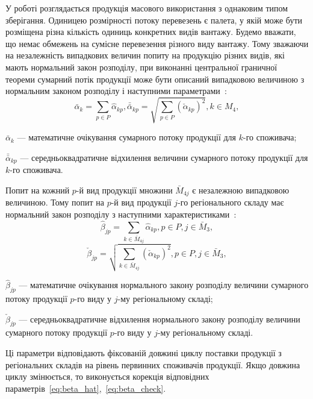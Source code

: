 У роботі розглядається продукція масового використання з однаковим типом зберігання. Одиницею розмірності потоку перевезень є палета, у якій може бути розміщена різна кількість одиниць конкретних видів вантажу. Будемо вважати, що немає обмежень на сумісне перевезення різного виду вантажу. Тому зважаючи на незалежність випадкових величин попиту на продукцію різних видів, які мають нормальний закон розподілу, при виконанні центральної граничної теореми сумарний потік продукції може бути описаний випадковою величиною з нормальним законом розподілу і наступними параметрами~\cite{Stankevich}:
\begin{equation}
	\bar{\alpha}_k = \sum_{p\in P}\hat{\alpha}_{kp},\bar{\bar{\alpha}}_{kp} = \sqrt{\sum_{p \in P} (\check{\alpha}_{kp})^2}, k \in M_4,
\end{equation}
\begin{description}
	\item[де] $\bar{\alpha}_k$ --- математичне очікування сумарного потоку продукції для $k$-го споживача;
	\item $\bar{\bar{\alpha}}_{kp}$ --- середньоквадратичне відхилення величини сумарного потоку продукції для $k$-го споживача.
\end{description}

Попит на кожний $p$-й вид продукції множини $\bar{M}_{4j}$ є незалежною випадковою величиною.
Тому попит на $p$-й вид продукції $j$-го регіонального складу має нормальний закон розподілу з наступними характеристиками~\cite{Stankevich}:
\begin{equation} \label{eq:beta_hat}
	\hat{\beta}_{jp} = \sum_{k\in \bar{M}_{4j}} \hat{\alpha}_{kp}, p \in P, j \in \bar{M}_3,
\end{equation}
\begin{equation} \label{eq:beta_check}
	\check{\beta}_{jp} = \sqrt{\sum_{k\in \bar{M}_{4j}}(\check{\alpha}_{kp})^2} , p \in P, j \in \bar{M}_3,
\end{equation}
\begin{description}
	\item[де] $\hat{\beta}_{jp}$ --- математичне очікування нормального закону розподілу величини сумарного потоку продукції $p$-го виду у $j$-му регіональному складі;
	\item $\check{\beta}_{jp}$ --- середньоквадратичне відхилення нормального закону розподілу величини сумарного потоку продукції $p$-го виду у $j$-му регіональному складі.
\end{description}

Ці параметри відповідають фіксованій довжині циклу поставки продукції з регіональних складів на рівень первинних споживачів продукції. Якщо довжина циклу змінюється, то виконується корекція відповідних параметрів~\eqref{eq:beta_hat},~\eqref{eq:beta_check}.

